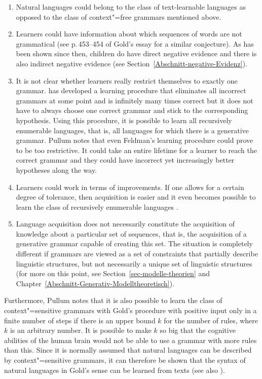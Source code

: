 \begin{enumerate}
\item Natural languages could belong to the class of text-learnable languages as opposed to the class of context"=free grammars mentioned above.

\item Learners could have information about which sequences of words are not grammatical (see p.\,453--454 of Gold's essay for a similar
conjecture). As has been shown since then, children do have direct negative evidence and there is also indirect
negative evidence (see Section~\ref{Abschnitt-negative-Evidenz}). 

\item It is not clear whether learners really restrict themselves to exactly one grammar. \citet{Feldman72a} has developed a learning procedure that
eliminates all incorrect grammars at some point and is infinitely many times correct but it does not have to always choose one correct grammar
and stick to the corresponding hypothesis.
Using this procedure, it is possible to learn all recursively enumerable languages, that is, all languages
for which there is a generative grammar. Pullum notes that even Feldman's learning procedure could prove to be too restrictive. It could take an entire
lifetime for a learner to reach the correct grammar and they could have incorrect yet increasingly better hypotheses along the way.

\item Learners could work in terms of improvements. If one allows for a certain degree of tolerance, then acquisition is easier and it even becomes
possible to learn the class of recursively enumerable languages  \citep{Wharton74a}.

\item Language acquisition does not necessarily constitute the acquisition of knowledge about a particular set of sequences, that is, the acquisition
of a generative grammar capable of creating this set. The situation is completely different if grammars are viewed as a set of constraints that
partially describe linguistic structures, but not necessarily a unique set of linguistic structures (for more on this point, see
      Section~\ref{sec-modelle-theorien} and Chapter~\ref{Abschnitt-Generativ-Modelltheoretisch}).
\end{enumerate}

\noindent
Furthermore, Pullum notes that it is also possible to learn the class of context"=sensitive grammars
with Gold's procedure with positive input only in a finite number of steps if there is an upper
bound $k$ for the number of rules, where $k$ is an arbitrary number.
It is possible to make $k$ so big that the cognitive abilities of the human brain would not be able to use a grammar with more rules than this.
Since it is normally assumed that natural languages can be described by context"=sensitive grammars, it can therefore
be shown that the syntax of natural languages in Gold's sense can be learned from texts (see also \citealp[--196]{SP2002b}).  

